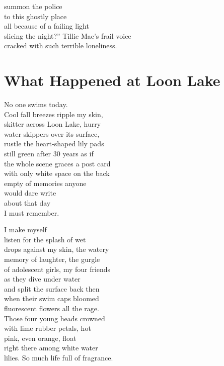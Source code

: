 \documentclass[twoside,10pt]{book}
\begin{document}
summon the police\\
to this ghostly place\\
all because of a failing light\\
slicing the night?'' Tillie Mae's frail voice\\
cracked with such terrible loneliness.


\clearpage
\section{What Happened at Loon Lake}

No one swims today.\\
Cool fall breezes ripple my skin,\\
skitter across Loon Lake, hurry\\
water skippers over its surface,\\
rustle the heart-shaped lily pads\\
still green after 30 years as if\\
the whole scene graces a post card\\
with only white space on the back\\
empty of memories anyone\\
would dare write\\
about that day\\
I must remember.

I make myself\\
listen for the splash of wet\\
drops against my skin, the watery\\
memory of laughter, the gurgle\\
of adolescent girls, my four friends\\
as they dive under water\\
and split the surface back then\\
when their swim caps bloomed\\
fluorescent flowers all the rage.\\
Those four young heads crowned\\
with lime rubber petals, hot\\
pink, even orange, float\\
right there among white water\\
lilies. So much life full of fragrance.
\end{document}
